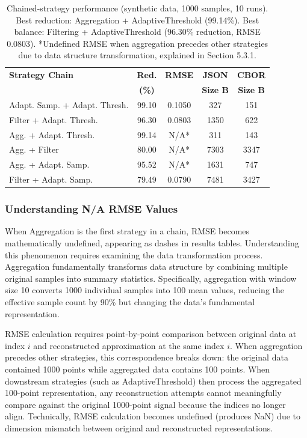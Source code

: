 \documentclass[10pt,twocolumn]{article}
\begin{document}
\begin{table}[H]
\centering
\footnotesize
\begin{tabular}{|p{2.5cm}|c|c|c|c|}
\hline
\textbf{Strategy Chain} & \textbf{Red.} & \textbf{RMSE} & \textbf{JSON} & \textbf{CBOR} \\
& \textbf{(\%)} &  & \textbf{Size B} & \textbf{Size B} \\
\hline
Adapt. Samp. + Adapt. Thresh. & 99.10 & 0.1050 & 327 & 151 \\
\hline
Filter + Adapt. Thresh. & 96.30 & 0.0803 & 1350 & 622 \\
\hline
Agg. + Adapt. Thresh. & 99.14 & N/A* & 311 & 143 \\
\hline
Agg. + Filter & 80.00 & N/A* & 7303 & 3347 \\
\hline
Agg. + Adapt. Samp. & 95.52 & N/A* & 1631 & 747 \\
\hline
Filter + Adapt. Samp. & 79.49 & 0.0790 & 7481 & 3427 \\
\hline
\end{tabular}
\caption{Chained-strategy performance (synthetic data, 1000 samples, 10 runs). Best reduction: Aggregation + AdaptiveThreshold (99.14\%). Best balance: Filtering + AdaptiveThreshold (96.30\% reduction, RMSE 0.0803). *Undefined RMSE when aggregation precedes other strategies due to data structure transformation, explained in Section 5.3.1.}
\label{tab:chainedstrat}
\end{table}

\vspace{0.15cm}

\subsubsection{Understanding N/A RMSE Values}

When Aggregation is the first strategy in a chain, RMSE becomes mathematically undefined, appearing as dashes in results tables. Understanding this phenomenon requires examining the data transformation process. Aggregation fundamentally transforms data structure by combining multiple original samples into summary statistics. Specifically, aggregation with window size 10 converts 1000 individual samples into 100 mean values, reducing the effective sample count by 90\% but changing the data's fundamental representation.

RMSE calculation requires point-by-point comparison between original data at index $i$ and reconstructed approximation at the same index $i$. When aggregation precedes other strategies, this correspondence breaks down: the original data contained 1000 points while aggregated data contains 100 points. When downstream strategies (such as AdaptiveThreshold) then process the aggregated 100-point representation, any reconstruction attempts cannot meaningfully compare against the original 1000-point signal because the indices no longer align. Technically, RMSE calculation becomes undefined (produces NaN) due to dimension mismatch between original and reconstructed representations.
\end{document}
